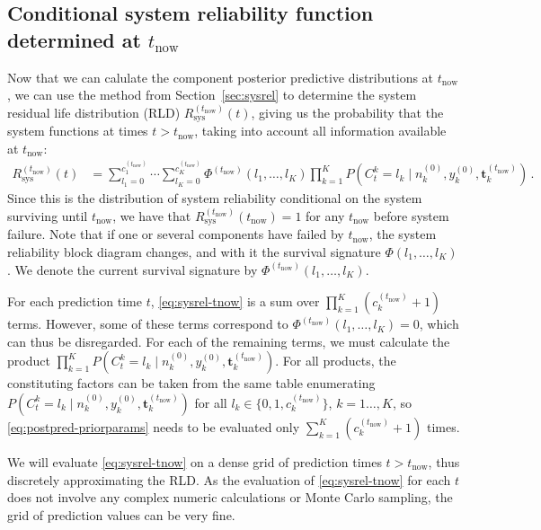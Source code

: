 \documentclass[authoryear]{elsarticle}
\renewcommand{\vec}[1]{{\bm#1}}
\newcommand{\uz}{^{(0)}} %
\def\ykz{y\uz_k}
\def\nkz{n\uz_k}
\def\tnow{t_\text{now}}
\newcommand{\Rsysnow}{R^{(t_\text{now})}_\text{sys}}
\def\cknow{c_k^{(\tnow)}}
\def\vectknow{\vec{t}_k^{(\tnow)}}
\def\Phinow{\Phi^{(\tnow)}}
\begin{document}
\subsection{Conditional system reliability function determined at $\tnow$}
\label{sec:sysreltnow}

Now that we can calulate the component posterior predictive distributions at $\tnow$,
we can use the method from Section~\ref{sec:sysrel}
to determine the system residual life distribution (RLD) $\Rsysnow(t)$,
giving us the probability that the system functions at times $t > \tnow$,
taking into account all information available at $\tnow$:
\begin{align}
\Rsysnow(t) &= \sum_{l_1=0}^{c_1^{(\tnow)}} \cdots \sum_{l_K=0}^{c_K^{(\tnow)}} \Phinow(l_1,\ldots,l_K)
               \prod_{k=1}^K P(C^k_t = l_k\mid\nkz,\ykz, \vectknow)\,.
\label{eq:sysrel-tnow}
\end{align}
Since this is the distribution of system reliability conditional on the system surviving until $\tnow$,
we have that $\Rsysnow(\tnow) = 1$ for any $\tnow$ before system failure.
Note that if one or several components have failed by $\tnow$,
the system reliability block diagram changes, and with it the survival signature $\Phi(l_1,\ldots,l_K)$.
We denote the current survival signature by $\Phinow(l_1,\ldots,l_K)$.

For each prediction time $t$,
\eqref{eq:sysrel-tnow} is a sum over $\prod_{k=1}^K (\cknow + 1)$ terms.
However, some of these terms correspond to $\Phinow(l_1,\ldots,l_K) = 0$,
which can thus be disregarded.
For each of the remaining terms,
we must calculate the product $\prod_{k=1}^K P(C^k_t = l_k\mid\nkz,\ykz, \vectknow)$.
For all products, the constituting factors can be taken from the same table
enumerating $P(C^k_t = l_k\mid\nkz,\ykz, \vectknow)$ for all $l_k \in \{0, 1, \cknow\}$, $k=1\ldots,K$,
so \eqref{eq:postpred-priorparams} needs to be evaluated 
only $\sum_{k=1}^K (\cknow + 1)$ times.

We will evaluate \eqref{eq:sysrel-tnow} on a dense grid of prediction times $t > \tnow$,
thus discretely approximating the RLD.
As the evaluation of \eqref{eq:sysrel-tnow} for each $t$ does not involve any complex numeric calculations or Monte Carlo sampling,
the grid of prediction values can be very fine.
%
\end{document}
